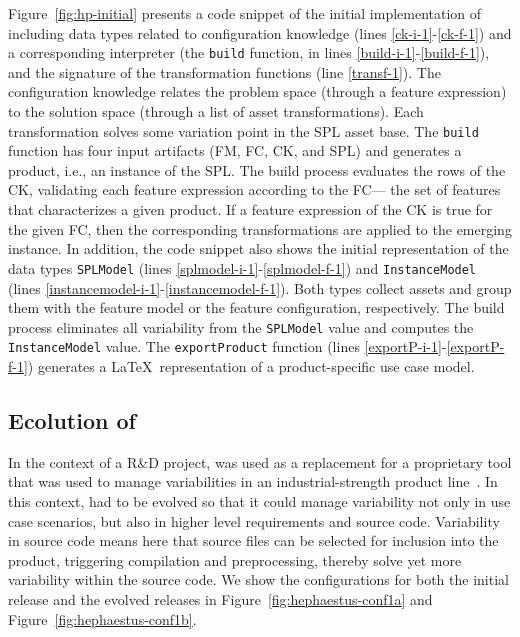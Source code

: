 Figure~\ref{fig:hp-initial} presents a code snippet of
the initial implementation of \hp{} including data types related to
configuration knowledge (lines \ref{ck-i-1}-\ref{ck-f-1}) and a
corresponding interpreter (the \texttt{build} function, in lines
\ref{build-i-1}-\ref{build-f-1}), and the signature of the
transformation functions (line \ref{transf-1}). The configuration
knowledge relates the problem space (through a feature expression) to
the solution space (through a list of asset transformations). Each
transformation solves some variation point in the SPL asset base. The
\texttt{build} function has four input artifacts (FM, FC, CK, and SPL)
and generates a product, i.e., an instance of the SPL. The build
process evaluates the rows of the CK, validating each feature
expression according to the FC--- the set of features that
characterizes a given product. If a feature expression of the CK is
true for the given FC, then the corresponding transformations are
applied to the emerging instance. In addition, the code snippet also
shows the initial representation of the data types \texttt{SPLModel}
(lines \ref{splmodel-i-1}-\ref{splmodel-f-1}) and
\texttt{InstanceModel} (lines
\ref{instancemodel-i-1}-\ref{instancemodel-f-1}). Both types collect
assets and group them with the feature model or the feature
configuration, respectively. The build process eliminates all
variability from the \texttt{SPLModel} value and computes the
\texttt{InstanceModel} value. The \texttt{exportProduct} function
(lines \ref{exportP-i-1}-\ref{exportP-f-1}) generates a \LaTeX\
representation of a product-specific use case model.


\subsection{Ecolution of \hp} 
\label{sec:hp-evolution}

In the context of a R\&D project, \hp{} was used as a replacement for
a proprietary tool that was used to manage variabilities in an
industrial-strength product line~\cite{ferreira:2010}. In this
context, \hp{} had to be evolved so that it could manage variability
not only in use case scenarios, but also in higher level requirements
and source code. Variability in source code means here that source
files can be selected for inclusion into the product, triggering
compilation and preprocessing, thereby solve yet more variability
within the source code. We show the configurations for both the
initial release and the evolved releases in
Figure~\ref{fig:hephaestus-conf1a} and
Figure~\ref{fig:hephaestus-conf1b}.

